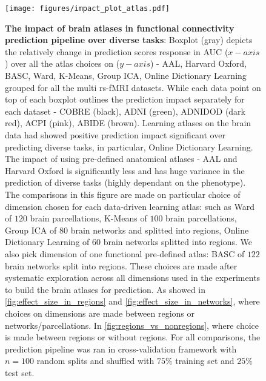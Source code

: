 \documentclass[5p]{elsarticle}
\begin{document}
\begin{figure}
    \centerline{%
    \texttt{[image: figures/impact\_plot\_atlas.pdf]}%
    }%
    \caption[choice of atlas]{\textbf{The impact of brain atlases in
            functional connectivity prediction pipeline over diverse tasks}:
            Boxplot (gray) depicts the relatively change in prediction
            scores response in AUC ($x-axis$) over all the atlas choices on
            ($y-axis$) - AAL, Harvard Oxford, BASC, Ward, K-Means, Group ICA,
            Online Dictionary Learning grouped for all the multi rs-fMRI
            datasets. While each data point on top of each boxplot outlines
            the prediction impact separately for each dataset - COBRE (black),
            ADNI (green), ADNIDOD (dark red), ACPI (pink), ABIDE (brown).
            Learning atlases on the brain data had showed positive prediction
            impact significant over predicting diverse tasks, in particular,
            Online Dictionary Learning. The impact of using pre-defined
            anatomical atlases - AAL and Harvard Oxford is significantly less
            and has huge variance in the prediction of diverse tasks (highly
            dependant on the phenotype). The comparisons in this figure
            are made on particular choice of dimension chosen for each
            data-driven learning atlas: such as Ward of $120$ brain
            parcellations, K-Means of $100$ brain parcellations, Group ICA of
            $80$ brain networks and splitted into regions, Online Dictionary
            Learning of $60$ brain networks splitted into regions. We also
            pick dimension of one functional pre-defined atlas: BASC of $122$
            brain networks split into regions. These choices are made after
            systematic exploration across all dimensions used
            in the experiments to build the brain atlases for prediction. As
            showed in \autoref{fig:effect_size_in_regions} and
            \autoref{fig:effect_size_in_networks}, where choices on dimensions
            are made between regions or networks/parcellations. In
            \autoref{fig:regions_vs_nonregions}, where choice is made between
            regions or without regions. For all comparisons, the prediction
            pipeline was ran in cross-validation framework with $n=100$
            random splits and shuffled with $75\%$ training set and $25\%$
            test set.
    \label{fig:impact_atlas}}
\end{figure}
\end{document}
